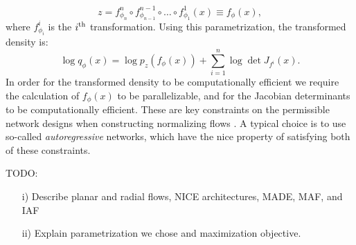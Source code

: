 \documentclass[fleqn,usenatbib]{mnras}
\begin{document}
\begin{equation}
z = f^n_{\phi_n} \circ f^{n-1}_{\phi_{n-1}} \circ \dots \circ f^1_{\phi_1}(x) \equiv f_\phi(x),
\end{equation}
where $f^i_{\phi_i}$ is the $i^{\rm th}$ transformation. Using this parametrization, the transformed density is:
\begin{equation}
    \log q_\phi(x) = \log p_z(f_\phi(x)) + \sum_{i=1}^n \log \det J_{f^i}(x).
\end{equation}
In order for the transformed density to be computationally efficient we require the calculation of $f_\phi(x)$ to be parallelizable, and for the Jacobian determinants to be computationally efficient. These are key constraints on the permissible network designs when constructing normalizing flows \cite{rezende/etal:2015, papamakarios/etal:2019}. A typical choice is to use so-called \emph{autoregressive} networks, which have the nice property of satisfying both of these constraints.

TODO:
\begin{itemize}
\item[i)] Describe planar and radial flows, NICE architectures, MADE, MAF, and IAF
\item[ii)] Explain parametrization we chose and maximization objective.
\end{itemize}
\end{document}
